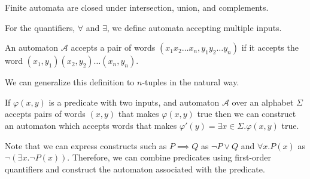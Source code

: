 \begin{theorem}
    Finite automata are closed under intersection, union, and complements.
\end{theorem}

For the quantifiers, $\forall$ and $\exists$, we define automata accepting multiple inputs. 
\begin{definition}
    An automaton $\mathcal{A}$ accepts a pair of words $ (x_1x_2\dots x_n, y_1y_2\dots y_n)$ if it accepts the word $(x_1,y_1)(x_2,y_2)\dots(x_n,y_n)$.
\end{definition}

We can generalize this definition to $n$-tuples in the natural way.

\begin{theorem}
    If $\varphi(x,y)$ is a predicate with two inputs, and automaton $\mathcal{A}$ over an alphabet $\Sigma$ accepts pairs of words $(x, y)$ that makes $\varphi(x, y)$ true then we can construct an automaton which accepts words that makes $\varphi'(y) = \exists x \in \Sigma. \varphi(x,y)$ true.
\end{theorem}

Note that we can express constructs such as $P \implies Q$ as $\lnot P \lor Q$ and $\forall x. P(x)$ as $\lnot (\exists x. \lnot P(x))$.
Therefore, we can combine predicates using first-order quantifiers and construct the automaton associated with the predicate.

